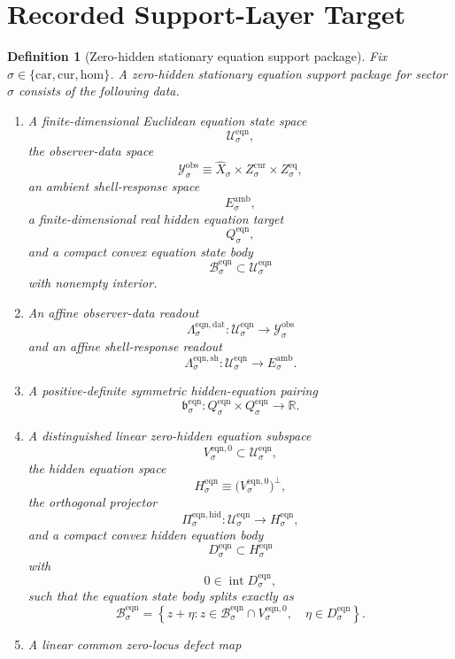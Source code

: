 \documentclass[11pt]{article}
\newcommand{\Car}{\mathrm{car}}
\newcommand{\Cur}{\mathrm{cur}}
\newcommand{\Hom}{\mathrm{hom}}
\newcommand{\VisibleAffine}[1]{\widehat X_{#1}}
\newcommand{\DataSpace}[1]{\mathcal Y_{#1}^{\mathrm{obs}}}
\newcommand{\AmbientTarget}[1]{E_{#1}^{\mathrm{amb}}}
\newcommand{\EqnSpace}[1]{\mathcal U_{#1}^{\mathrm{eqn}}}
\newcommand{\EqnBody}[1]{\mathcal B_{#1}^{\mathrm{eqn}}}
\newcommand{\EqnData}[1]{\Lambda_{#1}^{\mathrm{eqn,dat}}}
\newcommand{\EqnShell}[1]{\Lambda_{#1}^{\mathrm{eqn,sh}}}
\newcommand{\EqnTarget}[1]{Q_{#1}^{\mathrm{eqn}}}
\newcommand{\EqnPair}[1]{\mathfrak b_{#1}^{\mathrm{eqn}}}
\newcommand{\EqnZero}[1]{V_{#1}^{\mathrm{eqn},0}}
\newcommand{\EqnHidden}[1]{H_{#1}^{\mathrm{eqn}}}
\newcommand{\EqnHiddenBody}[1]{D_{#1}^{\mathrm{eqn}}}
\newcommand{\EqnProj}[1]{\Pi_{#1}^{\mathrm{eqn,hid}}}
\newtheorem{definition}{Definition}
\begin{document}
\section{Recorded Support-Layer Target}

\begin{definition}[Zero-hidden stationary equation support package]
\label{def:support}
Fix \(\sigma\in\{\Car,\Cur,\Hom\}\). A \emph{zero-hidden stationary equation support package} for sector \(\sigma\) consists of the following data.
\begin{enumerate}
    \item A finite-dimensional Euclidean equation state space
    \[
    \EqnSpace{\sigma},
    \]
    the observer-data space
    \[
    \DataSpace{\sigma}
    \equiv
    \VisibleAffine{\sigma}\times Z_{\sigma}^{\mathrm{cur}}\times Z_{\sigma}^{\mathrm{eq}},
    \]
    an ambient shell-response space
    \[
    \AmbientTarget{\sigma},
    \]
    a finite-dimensional real hidden equation target
    \[
    \EqnTarget{\sigma},
    \]
    and a compact convex equation state body
    \[
    \EqnBody{\sigma}\subset\EqnSpace{\sigma}
    \]
    with nonempty interior.
    \item An affine observer-data readout
    \[
    \EqnData{\sigma}:\EqnSpace{\sigma}\to\DataSpace{\sigma}
    \]
    and an affine shell-response readout
    \[
    \EqnShell{\sigma}:\EqnSpace{\sigma}\to\AmbientTarget{\sigma}.
    \]
    \item A positive-definite symmetric hidden-equation pairing
    \[
    \EqnPair{\sigma}:
    \EqnTarget{\sigma}\times\EqnTarget{\sigma}\to\mathbb R.
    \]
    \item A distinguished linear zero-hidden equation subspace
    \[
    \EqnZero{\sigma}\subset\EqnSpace{\sigma},
    \]
    the hidden equation space
    \[
    \EqnHidden{\sigma}
    \equiv
    \bigl(\EqnZero{\sigma}\bigr)^{\perp},
    \]
    the orthogonal projector
    \[
    \EqnProj{\sigma}:\EqnSpace{\sigma}\to\EqnHidden{\sigma},
    \]
    and a compact convex hidden equation body
    \[
    \EqnHiddenBody{\sigma}\subset\EqnHidden{\sigma}
    \]
    with
    \[
    0\in\operatorname{int}\EqnHiddenBody{\sigma},
    \]
    such that the equation state body splits exactly as
    \begin{equation}
    \EqnBody{\sigma}
    =
    \left\{
    z+\eta:
    z\in\EqnBody{\sigma}\cap\EqnZero{\sigma},
    \quad
    \eta\in\EqnHiddenBody{\sigma}
    \right\}.
    \label{eq:supportsplitting}
    \end{equation}
    \item A linear common zero-locus defect map

\end{enumerate}
\end{definition}
\end{document}
